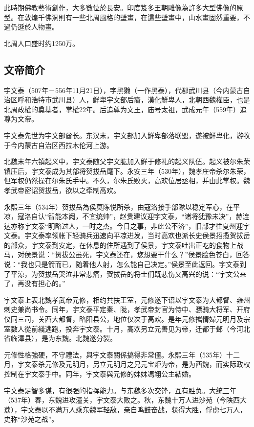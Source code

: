 此時期佛教藝術創作，大多數位於長安。印度笈多王朝雕像為許多大型佛像的原型。在敦煌千佛洞則有一些北周風格的壁畫，在這些壁畫中，山水畫固然重要，不過仍遜於人物畫。

北周人口盛时约1250万。


\subsection{文帝简介}

宇文泰（507年－556年11月21日），字黑獭（一作黑泰），代郡武川县（今内蒙古自治区呼和浩特市武川县）人，鲜卑宇文部后裔，漢化鮮卑人，北朝西魏權臣，也是北周政權的奠基者，掌權22年。后追尊为文王，庙号太祖，武成元年（559年）追尊为文帝。

宇文泰先世为宇文部酋长。东汉末，宇文部加入鲜卑部落联盟，遂被鲜卑化，游牧于今内蒙古自治区西拉木伦河上游。

北魏末年六镇起义中，宇文泰随父宇文肱加入鲜于修礼的起义队伍。起义被尔朱荣镇压后，宇文泰成为其部将贺拔岳麾下。永安三年（530年），魏孝庄帝杀尔朱荣，但军权仍然操在尔朱氏手中。不久，尔朱氏败灭，高欢位居丞相，并由此掌权。魏孝武帝密诏贺拔岳，欲以之牵制高欢。

永熙三年（534年）贺拔岳為侯莫陈悦所杀，由寇洛接手部隊以稳定军心，在平凉，寇洛自认“智能本阙，不宜统帅”，赵贵建议迎宇文泰，“诸将犹豫未决”，赫连达亦称宇文泰“明略过人，一时之杰。今日之事，非此公不济”，旧部才往夏州迎宇文泰。宇文泰率领帐下轻骑兵迅速向平凉进发，当时高欢也派长史侯景招揽贺拔岳的部众，宇文泰到安定，在休息的住所遇到了侯景，宇文泰吐出正吃的食物上战马，对侯景说：“贺拔公虽死，宇文泰还在，您想要干什么？”侯景脸色苍白，回答说：“我也只是箭而已，随着他人射，怎么能自己决定。”侯景至此返回。宇文泰到了平涼，为贺拔岳哭泣非常悲痛，贺拔岳的将士们既悲伤又高兴的说：“宇文公来了，再没有担心的。”

宇文泰上表北魏孝武帝元修，相约共扶王室，元修遂下诏以宇文泰为大都督、雍州刺史兼尚书令。同年，宇文泰平定秦、陇，孝武帝封官为侍中、骠骑大将军、开府仪同三司，关西大都督，略阳县公，地位仅次于高欢。是年元修攜情婦元明月及宗室數人從前綫逃跑，投奔宇文泰。十月，高欢另立元善见为帝，迁都于邺（今河北省临漳县），是为东魏。北魏遂分裂。

元修性格強硬，不守禮法，與宇文泰關係搞得非常僵。永熙三年（535年）十二月，宇文泰杀元修及元明月，另立元明月之兄元宝炬为帝，是为西魏，而实际政权控制在宇文泰手中。同年，宇文泰與元修的妹妹馮翊公主結婚。

宇文泰足智多谋，有很强的指挥能力。与东魏多次交锋，互有胜负。大统三年（537年）春，东魏进攻潼关，宇文泰大败之。秋，东魏十万人进沙苑（今陕西大荔），宇文泰以不满万人乘东魏军轻敌，亲自鸣鼓奋战，获得大胜，俘虏七万人，史称“沙苑之战”。

